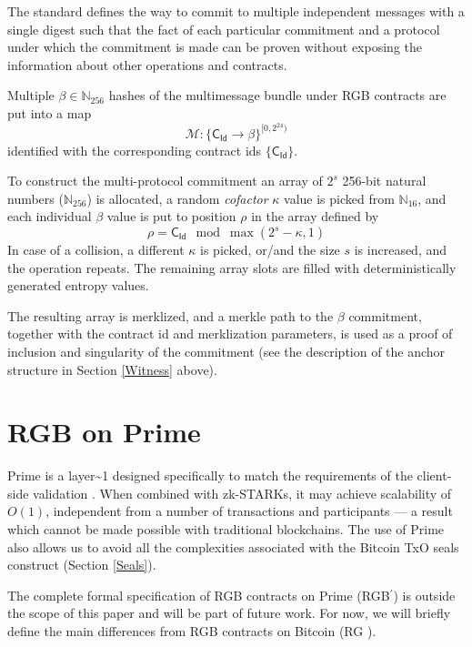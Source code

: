 \documentclass[9pt,oneside]{amsart}
\def\bitcoin{%
  \leavevmode
  \vtop{\offinterlineskip %
    \setbox0=\hbox{B}%
    \setbox2=\hbox to\wd0{\hfil\hskip-.03em
    \vrule height .3ex width .15ex\hskip .08em
    \vrule height .3ex width .15ex\hfil}
    \vbox{\copy2\box0}\box2}}
\begin{document}
\begin{multicols}{2}
The standard defines the way to commit to multiple independent messages
with a single digest such that the fact of each particular commitment
and a protocol under which the commitment is made can be proven without
exposing the information about other operations and contracts.

Multiple $\beta \in \mathbb{N}_{256}$ hashes of the multimessage bundle under
RGB contracts are put into a map
\noindent
\begin{equation}
\mathcal{M}: \{ \mathsf{C_{Id}} \rightarrow \beta \}^{[0, 2^{24})}
\end{equation}
\noindent
identified with the corresponding contract ids $\{ \mathsf{C_{Id}} \}$.

To construct the multi-protocol commitment an array of $2^s$
256-bit natural numbers ($\mathbb{N}_{256}$) is allocated,
a random \emph{cofactor} $\kappa$ value is picked from $\mathbb{N}_{16}$,
and each individual $\beta$ value is put to position $\rho$ in the array defined by
\noindent
\begin{equation}
    \rho = \mathsf{C_{Id}} \mod \max(2^s - \kappa, 1)
\end{equation}
\noindent
In case of a collision, a different $\kappa$ is picked,
or/and the size $s$ is increased, and the operation repeats.
The remaining array slots are filled with deterministically generated entropy values.

The resulting array is merklized, and a merkle path to the $\beta$ commitment,
together with the contract id and merklization parameters, is used as a proof of
inclusion and singularity of the commitment
(see the description of the \gls{anchor} structure in Section \ref{Witness} above).


\section{RGB on Prime}

Prime is a \gls{layer~1} designed specifically to match the requirements of the client-side validation \cite{Prime}.
When combined with zk-STARKs, it may achieve scalability of $O(1)$,
independent from a number of transactions and participants \cite{Prime} —
a result which cannot be made possible with traditional blockchains.
The use of Prime also allows us to avoid all the complexities associated
with the Bitcoin TxO seals construct (Section \ref{Seals}).

The complete formal specification of RGB contracts on Prime (RGB$^\prime$)
is outside the scope of this paper and will be part of future work.
For now, we will briefly define the main differences from RGB contracts on Bitcoin (RG\bitcoin).


\end{multicols}
\end{document}
